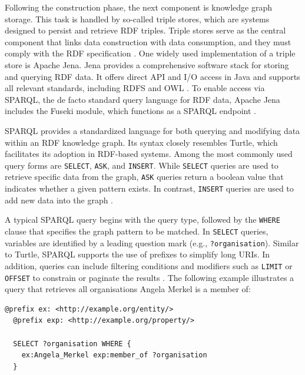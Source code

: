 \documentclass[a4paper,oneside,bibliography=totoc]{scrbook}
\begin{document}
Following the construction phase, the next component is knowledge graph storage. This task is handled by so-called triple stores, which are systems designed to persist and retrieve RDF triples. Triple stores serve as the central component that links data construction with data consumption, and they must comply with the \ac{RDF} specification \cite{Rusher2003}. One widely used implementation of a triple store is Apache Jena. Jena provides a comprehensive software stack for storing and querying RDF data. It offers direct API and I/O access in Java and supports all relevant standards, including \ac{RDFS} and \ac{OWL} \cite{Carroll2004}. To enable access via \ac{SPARQL}, the de facto standard query language for RDF data, Apache Jena includes the Fuseki module, which functions as a \ac{SPARQL} endpoint \cite{Chokshi2022}.

\ac{SPARQL} provides a standardized language for both querying and modifying data within an RDF knowledge graph. Its syntax closely resembles Turtle, which facilitates its adoption in RDF-based systems. Among the most commonly used query forms are \texttt{SELECT}, \texttt{ASK}, and \texttt{INSERT}. While \texttt{SELECT} queries are used to retrieve specific data from the graph, \texttt{ASK} queries return a boolean value that indicates whether a given pattern exists. In contrast, \texttt{INSERT} queries are used to add new data into the graph \cite{VillazonTerrazas2017}.

A typical \ac{SPARQL} query begins with the query type, followed by the \texttt{WHERE} clause that specifies the graph pattern to be matched. In \texttt{SELECT} queries, variables are identified by a leading question mark (e.g., \texttt{?organisation}). Similar to Turtle, SPARQL supports the use of prefixes to simplify long \acp{URI}. In addition, queries can include filtering conditions and modifiers such as \texttt{LIMIT} or \texttt{OFFSET} to constrain or paginate the results \cite{VillazonTerrazas2017}. The following example illustrates a query that retrieves all organisations Angela Merkel is a member of:

\pagebreak

\begin{lstlisting}[language=SPARQL, caption=Example of a SPARQL Query, label=lst:turtle_example]
  @prefix ex: <http://example.org/entity/>
  @prefix exp: <http://example.org/property/>
  
  SELECT ?organisation WHERE {
    ex:Angela_Merkel exp:member_of ?organisation
  }
\end{lstlisting}
\end{document}
